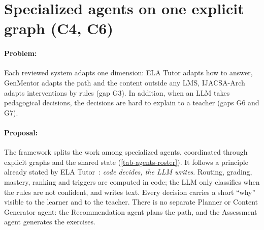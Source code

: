 \section[Specialized agents on one explicit graph]{Specialized agents on one explicit graph (C4, C6)}
\label{sec-c4}

\paragraph{Problem:} Each reviewed system adapts one dimension: ELA Tutor
adapts how to answer, GenMentor adapts the path and the content outside
any LMS, IJACSA-Arch adapts interventions by rules (gap G3). In addition,
when an LLM takes pedagogical decisions, the decisions are hard to
explain to a teacher (gaps G6 and G7).

\paragraph{Proposal:} The framework splits the work among specialized
agents, coordinated through explicit graphs and the shared state
(\cref{tab-agents-roster}). It follows a principle already stated by ELA
Tutor~\cite{lopezgoyez2026ela}: \emph{code decides, the LLM writes}.
Routing, grading, mastery, ranking and triggers are computed in code; the
LLM only classifies when the rules are not confident, and writes text.
Every decision carries a short ``why'' visible to the learner and to the
teacher. There is no separate Planner or Content Generator agent: the
Recommendation agent plans the path, and the Assessment agent generates
the exercises.

